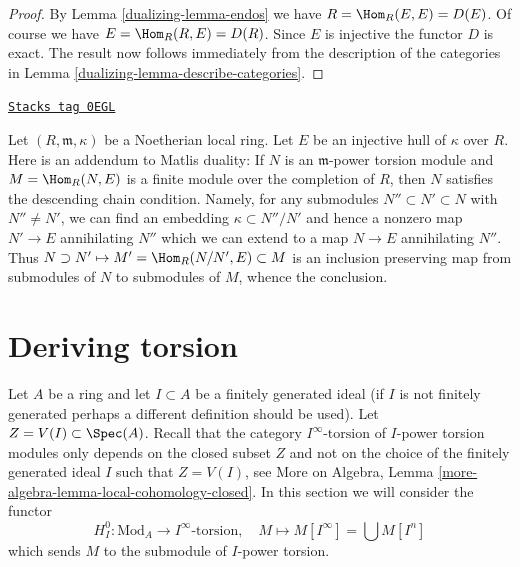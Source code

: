 \begin{proof}

By Lemma \ref{dualizing-lemma-endos} we have $R = \Hom_R(E, E) = D(E)$.
Of course we have $E = \Hom_R(R, E) = D(R)$. Since $E$ is injective
the functor $D$ is exact. The result now follows immediately from the
description of the categories in
Lemma \ref{dualizing-lemma-describe-categories}.
\end{proof}

\begin{remark}[Matlis]
\label{dualizing-remark-matlis}
\href{https://stacks.math.columbia.edu/tag/0EGL}{\texttt{Stacks tag 0EGL}}

Let $(R, \mathfrak m, \kappa)$ be a Noetherian local ring.
Let $E$ be an injective hull of $\kappa$ over $R$. Here is an
addendum to Matlis duality: If $N$ is an $\mathfrak m$-power torsion module
and $M = \Hom_R(N, E)$ is a finite module over the completion of $R$,
then $N$ satisfies the descending chain condition. Namely, for any
submodules $N'' \subset N' \subset N$ with $N'' \not = N'$, we can
find an embedding $\kappa \subset N''/N'$ and hence a nonzero
map $N' \to E$ annihilating $N''$ which we can extend to a map $N \to E$
annihilating $N''$. Thus $N \supset N' \mapsto M' = \Hom_R(N/N', E) \subset M$
is an inclusion preserving map from submodules of $N$ to submodules
of $M$, whence the conclusion.
\end{remark}

\section{Deriving torsion}
\label{dualizing-section-bad-local-cohomology}
Let $A$ be a ring and let $I \subset A$ be a finitely generated ideal
(if $I$ is not finitely generated perhaps a different definition
should be used). Let $Z = V(I) \subset \Spec(A)$. Recall that the
category $I^\infty\text{-torsion}$ of $I$-power torsion modules
only depends on the closed subset $Z$ and not on the choice of the
finitely generated ideal $I$ such that $Z = V(I)$, see
More on Algebra, Lemma \ref{more-algebra-lemma-local-cohomology-closed}.
In this section we will consider the functor
$$
H^0_{I} : \text{Mod}_A \longrightarrow I^\infty\text{-torsion},\quad
M \longmapsto M[I^\infty] = \bigcup M[I^n]
$$
which sends $M$ to the submodule of $I$-power torsion.

